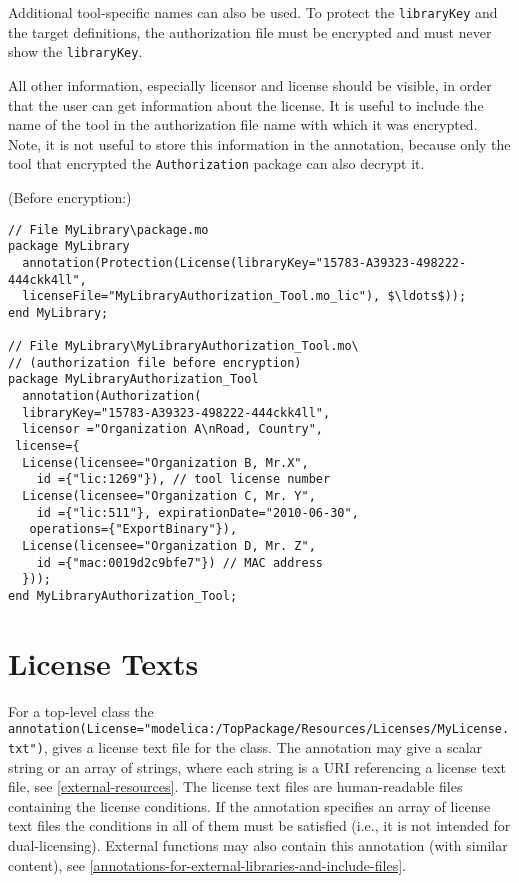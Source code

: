 Additional tool-specific names can also be used.
To protect the \lstinline!libraryKey! and the target definitions, the authorization file must be encrypted and must never show the \lstinline!libraryKey!.

\begin{nonnormative}
All other information, especially licensor and license should be visible, in order that the user can get information about the license.
It is useful to include the name of the tool in the authorization file name with which it was encrypted.
Note, it is not useful to store this information in the annotation, because only the tool that encrypted the \lstinline!Authorization! package can also decrypt it.
\end{nonnormative}

\begin{example}
(Before encryption:)
\begin{lstlisting}[language=modelica]
// File MyLibrary\package.mo
package MyLibrary
  annotation(Protection(License(libraryKey="15783-A39323-498222-444ckk4ll",
  licenseFile="MyLibraryAuthorization_Tool.mo_lic"), $\ldots$));
end MyLibrary;

// File MyLibrary\MyLibraryAuthorization_Tool.mo\
// (authorization file before encryption)
package MyLibraryAuthorization_Tool
  annotation(Authorization(
  libraryKey="15783-A39323-498222-444ckk4ll",
  licensor ="Organization A\nRoad, Country",
 license={
  License(licensee="Organization B, Mr.X",
    id ={"lic:1269"}), // tool license number
  License(licensee="Organization C, Mr. Y",
    id ={"lic:511"}, expirationDate="2010-06-30",
   operations={"ExportBinary"}),
  License(licensee="Organization D, Mr. Z",
    id ={"mac:0019d2c9bfe7"}) // MAC address
  }));
end MyLibraryAuthorization_Tool;
\end{lstlisting}
\end{example}


\section{License Texts}\label{license-texts}

For a top-level class the {\lstinline!annotation(License="modelica:/TopPackage/Resources/Licenses/MyLicense.txt")!}, gives a license text file for the class.
The annotation may give a scalar string or an array of strings, where each string is a URI referencing a license text file, see \cref{external-resources}.
The license text files are human-readable files containing the license conditions.
If the annotation specifies an array of license text files the conditions in all of them must be satisfied (i.e., it is not intended for dual-licensing).
External functions may also contain this annotation (with similar content), see \cref{annotations-for-external-libraries-and-include-files}.

